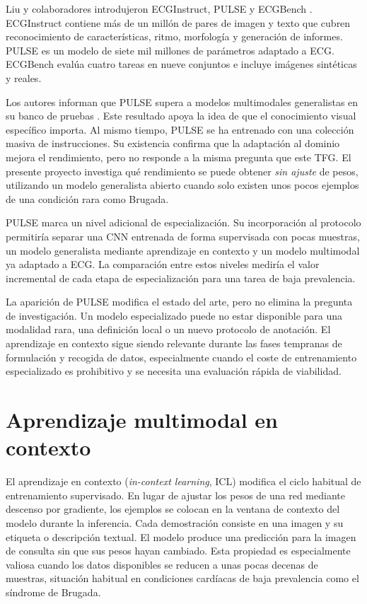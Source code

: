 Liu y colaboradores introdujeron ECGInstruct, PULSE y ECGBench \cite{liu2026}. ECGInstruct contiene más de un millón de pares de imagen y texto que cubren reconocimiento de características, ritmo, morfología y generación de informes. PULSE es un modelo de siete mil millones de parámetros adaptado a ECG. ECGBench evalúa cuatro tareas en nueve conjuntos e incluye imágenes sintéticas y reales.

Los autores informan que PULSE supera a modelos multimodales generalistas en su banco de pruebas \cite{liu2026}. Este resultado apoya la idea de que el conocimiento visual específico importa. Al mismo tiempo, PULSE se ha entrenado con una colección masiva de instrucciones. Su existencia confirma que la adaptación al dominio mejora el rendimiento, pero no responde a la misma pregunta que este TFG. El presente proyecto investiga qué rendimiento se puede obtener \emph{sin ajuste} de pesos, utilizando un modelo generalista abierto cuando solo existen unos pocos ejemplos de una condición rara como Brugada.

PULSE marca un nivel adicional de especialización. Su incorporación al protocolo permitiría separar una CNN entrenada de forma supervisada con pocas muestras, un modelo generalista mediante aprendizaje en contexto y un modelo multimodal ya adaptado a ECG. La comparación entre estos niveles mediría el valor incremental de cada etapa de especialización para una tarea de baja prevalencia.

La aparición de PULSE modifica el estado del arte, pero no elimina la pregunta de investigación. Un modelo especializado puede no estar disponible para una modalidad rara, una definición local o un nuevo protocolo de anotación. El aprendizaje en contexto sigue siendo relevante durante las fases tempranas de formulación y recogida de datos, especialmente cuando el coste de entrenamiento especializado es prohibitivo y se necesita una evaluación rápida de viabilidad.

\section{Aprendizaje multimodal en contexto}

El aprendizaje en contexto (\emph{in-context learning}, ICL) modifica el ciclo habitual de entrenamiento supervisado. En lugar de ajustar los pesos de una red mediante descenso por gradiente, los ejemplos se colocan en la ventana de contexto del modelo durante la inferencia. Cada demostración consiste en una imagen y su etiqueta o descripción textual. El modelo produce una predicción para la imagen de consulta sin que sus pesos hayan cambiado. Esta propiedad es especialmente valiosa cuando los datos disponibles se reducen a unas pocas decenas de muestras, situación habitual en condiciones cardíacas de baja prevalencia como el síndrome de Brugada.

